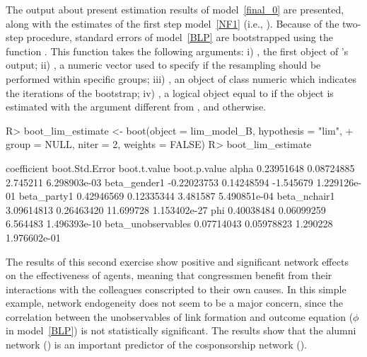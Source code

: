 \documentclass[nojss]{jss}
\begin{document}
	The output about present estimation results of model~\ref{final_0} are presented, along with the estimates of the first step model~\ref{NF1} (i.e., ). Because of the two-step procedure, standard errors of model~\ref{BLP} are bootstrapped using the function . This function takes the following arguments: i) , the first object of 's output; ii) , a numeric vector used to specify if the resampling should be performed within specific groups; iii) , an object of class numeric which indicates the iterations of the bootstrap; iv) 
	, a logical object equal to  if the object  is estimated with the argument  different from , and  otherwise.
	\begin{CodeChunk}
		\begin{CodeInput}
			R>  boot_lim_estimate <- boot(object = lim_model_B, hypothesis = "lim",
			+    group = NULL, niter = 2, weights = FALSE)
			R>  boot_lim_estimate
		\end{CodeInput}
		\begin{CodeOutput}
			coefficient boot.Std.Error boot.t.value boot.p.value
			alpha               0.23951648     0.08724885     2.745211 6.298903e-03
			beta_gender1       -0.22023753     0.14248594    -1.545679 1.229126e-01
			beta_party1         0.42946569     0.12335344     3.481587 5.490851e-04
			beta_nchair1        3.09614813     0.26463420    11.699728 1.153402e-27
			phi                 0.40038484     0.06099259     6.564483 1.496393e-10
			beta_unobservables  0.07714043     0.05978823     1.290228 1.976602e-01
		\end{CodeOutput}
	\end{CodeChunk}
	The results of this second exercise show positive and significant network effects on the effectiveness of agents, meaning that congressmen benefit from their interactions with the colleagues conscripted to their own causes. In this simple example, network endogeneity does not seem to be a major concern, since the correlation between the unobservables of link formation and outcome equation ($\phi$ in model~\ref{BLP}) is not statistically significant. The results show that the alumni network () is an important predictor of the cosponsorship network ().
	
\end{document}
